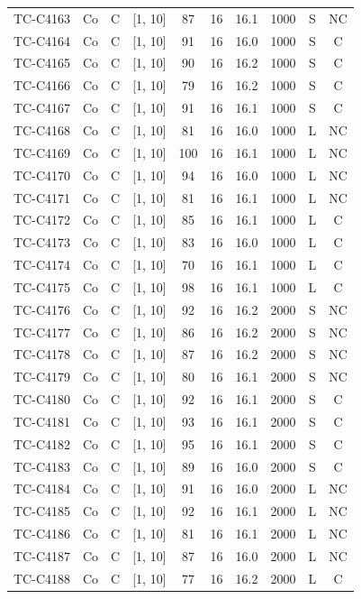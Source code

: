 \begin{longtable}{lccccccccc}
TC-C4163 & Co & C & [1, 10] & 87 & 16 & 16.1 & 1000 & S & NC \\
TC-C4164 & Co & C & [1, 10] & 91 & 16 & 16.0 & 1000 & S & C \\
TC-C4165 & Co & C & [1, 10] & 90 & 16 & 16.2 & 1000 & S & C \\
TC-C4166 & Co & C & [1, 10] & 79 & 16 & 16.2 & 1000 & S & C \\
TC-C4167 & Co & C & [1, 10] & 91 & 16 & 16.1 & 1000 & S & C \\
TC-C4168 & Co & C & [1, 10] & 81 & 16 & 16.0 & 1000 & L & NC \\
TC-C4169 & Co & C & [1, 10] & 100 & 16 & 16.1 & 1000 & L & NC \\
TC-C4170 & Co & C & [1, 10] & 94 & 16 & 16.0 & 1000 & L & NC \\
TC-C4171 & Co & C & [1, 10] & 81 & 16 & 16.1 & 1000 & L & NC \\
TC-C4172 & Co & C & [1, 10] & 85 & 16 & 16.1 & 1000 & L & C \\
TC-C4173 & Co & C & [1, 10] & 83 & 16 & 16.0 & 1000 & L & C \\
TC-C4174 & Co & C & [1, 10] & 70 & 16 & 16.1 & 1000 & L & C \\
TC-C4175 & Co & C & [1, 10] & 98 & 16 & 16.1 & 1000 & L & C \\
TC-C4176 & Co & C & [1, 10] & 92 & 16 & 16.2 & 2000 & S & NC \\
TC-C4177 & Co & C & [1, 10] & 86 & 16 & 16.2 & 2000 & S & NC \\
TC-C4178 & Co & C & [1, 10] & 87 & 16 & 16.2 & 2000 & S & NC \\
TC-C4179 & Co & C & [1, 10] & 80 & 16 & 16.1 & 2000 & S & NC \\
TC-C4180 & Co & C & [1, 10] & 92 & 16 & 16.1 & 2000 & S & C \\
TC-C4181 & Co & C & [1, 10] & 93 & 16 & 16.1 & 2000 & S & C \\
TC-C4182 & Co & C & [1, 10] & 95 & 16 & 16.1 & 2000 & S & C \\
TC-C4183 & Co & C & [1, 10] & 89 & 16 & 16.0 & 2000 & S & C \\
TC-C4184 & Co & C & [1, 10] & 91 & 16 & 16.0 & 2000 & L & NC \\
TC-C4185 & Co & C & [1, 10] & 92 & 16 & 16.1 & 2000 & L & NC \\
TC-C4186 & Co & C & [1, 10] & 81 & 16 & 16.1 & 2000 & L & NC \\
TC-C4187 & Co & C & [1, 10] & 87 & 16 & 16.0 & 2000 & L & NC \\
TC-C4188 & Co & C & [1, 10] & 77 & 16 & 16.2 & 2000 & L & C \\

\end{longtable}
